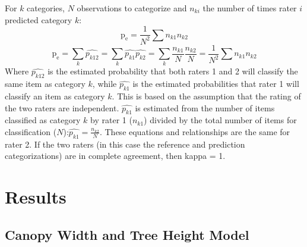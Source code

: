 \documentclass[12pt,twoside]{reedthesis}
\begin{document}
For \(k\) categories, \(N\) observations to categorize and \(n_{ki}\) the
number of times rater \(i\) predicted category \(k\):
\begin{equation}
\mathrm{p_e} = \frac{1}{N^2}\sum{n_{k1}n_{k2}}
\end{equation}
\begin{equation}
  \mathrm{p_e} = \sum_{k}\widehat{p_{k12}} = \sum_{k} \widehat{p_{k1}}\widehat{p_{k2}} = \sum_{k}\frac{n_{k1}}{N}\frac{n_{k2}}{N} =            \frac{1}{N^2}\sum{n_{k1}n_{k2}}
\end{equation}
Where \(\widehat{p_{k12}}\) is the estimated probability that both raters
1 and 2 will classify the same item as category \(k\), while
\(\widehat{p_{k1}}\) is the estimated probabilities that rater 1 will
classify an item as category \(k\). This is based on the assumption that
the rating of the two raters are independent. \(\widehat{p_{k1}}\) is
estimated from the number of items classified as category \(k\) by rater 1
(\(n_{k1}\)) divided by the total number of items for classification
(\(N\)):\(\widehat{p_{k1}}=\frac{n_{k2}}{N}\). These equations and
relationships are the same for rater 2. If the two raters (in this case
the reference and prediction categorizations) are in complete agreement,
then kappa = 1.

\hypertarget{results}{%
\chapter{Results}\label{results}}

\hypertarget{canopy-model-results}{%
\section{Canopy Width and Tree Height Model}\label{canopy-model-results}}
\end{document}

